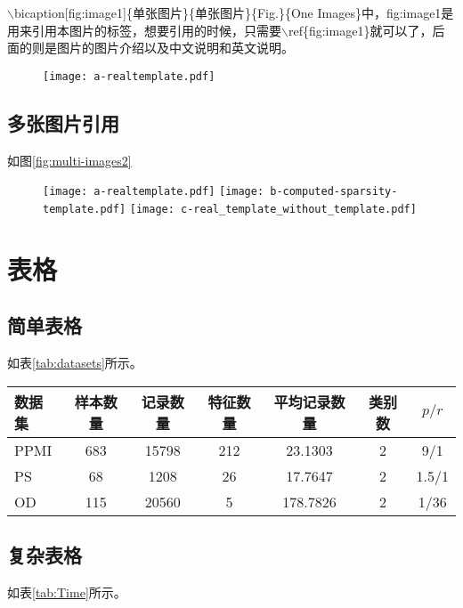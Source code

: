 $\backslash$bicaption[fig:image1]\{单张图片\}\{单张图片\}\{Fig.\}\{One Images\}中，fig:image1是用来引用本图片的标签，想要引用的时候，只需要$\backslash$ref\{fig:image1\}就可以了，后面的则是图片的图片介绍以及中文说明和英文说明。

\begin{figure}[htbp]
  \centering
  \texttt{[image: a-realtemplate.pdf]}
\end{figure}

\subsection{多张图片引用}
如图\ref{fig:multi-images2}
\begin{figure}[t!]
  \centering
  \texttt{[image: a-realtemplate.pdf]}
  \texttt{[image: b-computed-sparsity-template.pdf]}
  \texttt{[image: c-real\_template\_without\_template.pdf]}
\end{figure}


\section{表格}
\subsection{简单表格}
如表\ref{tab:datasets}所示。

\begin{table}[htbp]
  \centering
  \vspace{0.2cm}
  \zhongwu
  \begin{tabular}{lcccccc}
  \toprule
  数据集 & 样本数量 & 记录数量 & 特征数量 & 平均记录数量 & 类别数 & $p/r$\\
  \midrule
  PPMI & 683 & 15798 & 212 & 23.1303 & 2 & 9/1 \\
  PS & 68 & 1208 & 26 & 17.7647 & 2 & 1.5/1 \\
  OD & 115 & 20560 & 5 & 178.7826 & 2 & 1/36 \\
  \bottomrule
  \end{tabular}
\end{table}

\subsection{复杂表格}
如表\ref{tab:Time}所示。

